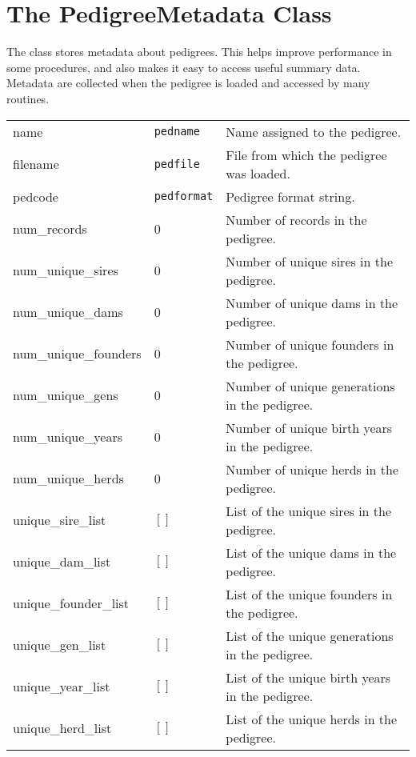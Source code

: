 \section{The PedigreeMetadata Class}
\label{sec:objects-metadata-objects}
The  class stores metadata about pedigrees. This helps improve performance in some procedures, and also makes it easy to access useful summary data. Metadata are collected when the pedigree is loaded and accessed by many \PyPedal{} routines.
\begin{center}
    \tablelasttail{\hline}
    \label{tbl:objects-metadata-attributes}
    \begin{xtabular}{l|l|p{4in}}
        name & \texttt{pedname} & Name assigned to the pedigree. \\
        filename & \texttt{pedfile} & File from which the pedigree was loaded. \\
        pedcode & \texttt{pedformat} & Pedigree format string. \\
        num_records & 0 & Number of records in the pedigree. \\
        num_unique_sires & 0 & Number of unique sires in the pedigree. \\
        num_unique_dams & 0 & Number of unique dams in the pedigree. \\
        num_unique_founders & 0 & Number of unique founders in the pedigree. \\
        num_unique_gens & 0 & Number of unique generations in the pedigree. \\
        num_unique_years & 0 & Number of unique birth years in the pedigree. \\
        num_unique_herds & 0 & Number of unique herds in the pedigree. \\
        unique_sire_list & $[]$ & List of the unique sires in the pedigree. \\
        unique_dam_list & $[]$ & List of the unique dams in the pedigree. \\
        unique_founder_list & $[]$ & List of the unique founders in the pedigree. \\
        unique_gen_list & $[]$ & List of the unique generations in the pedigree. \\
        unique_year_list & $[]$ & List of the unique birth years in the pedigree. \\
        unique_herd_list & $[]$ & List of the unique herds in the pedigree. \\
    \end{xtabular}
\end{center}
